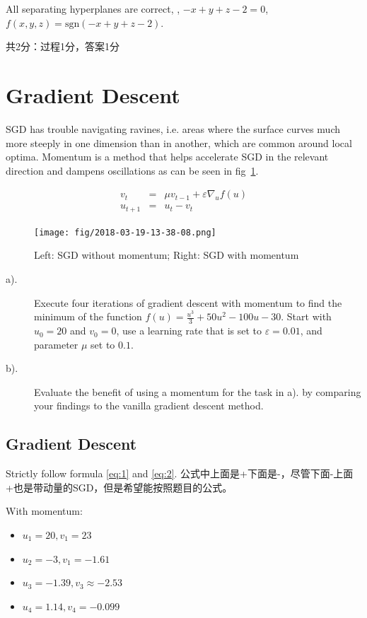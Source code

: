 \documentclass[12pt]{article}
\providecommand{\tightlist}{%
	\setlength{\itemsep}{0pt}\setlength{\parskip}{0pt}}
\begin{document}
All separating hyperplanes are correct, \eg, $-x+y+z-2=0$, $f(x,y,z)=\mathrm{sgn}(-x+y+z-2)$.

共2分：过程1分，答案1分



\section{Gradient Descent}
SGD has trouble navigating ravines, i.e. areas where the surface curves much more steeply in one dimension than in another, which are common around local optima. Momentum is a method that helps accelerate SGD in the relevant direction and dampens oscillations as can be seen in fig~\ref{fig:momentum}.

\begin{eqnarray}
	v_t & = & \mu v_{t-1} + \varepsilon \nabla_u f(u) \label{eq:1} \\
	u_{t+1} & =& u_{t} - v_t \label{eq:2}
\end{eqnarray}

\begin{figure}[!htbp]
	\centering
	\texttt{[image: fig/2018-03-19-13-38-08.png]}
	\caption{Left: SGD without momentum; Right: SGD with momentum} \label{fig:momentum}
\end{figure}

\begin{description}
	\item[a).] Execute four iterations of gradient descent with momentum to find the minimum of
	      the function $f(u) = \frac{u^3}{3} + 50 u^2-100u-30$. Start with $u_0 = 20$ and $v_0=0$, use a learning rate
	      that is set to $\varepsilon = 0.01$, and parameter $\mu$ set to $0.1$.
	\item[b).] Evaluate the benefit of using a momentum for the task in a). by comparing your
	      findings to the vanilla gradient descent method.
\end{description}

\subsection{Gradient Descent}

Strictly follow formula \ref{eq:1} and \ref{eq:2}. 公式中上面是+下面是-，尽管下面-上面+也是带动量的SGD，但是希望能按照题目的公式。

With momentum:

\begin{itemize}
	\tightlist
	\item $u_1=20, v_1=23$
	\item $u_2=-3, v_1=-1.61$
	\item $u_3=-1.39, v_3\approx -2.53$
	\item $u_4=1.14,v_4=-0.099$
\end{itemize}
\end{document}
